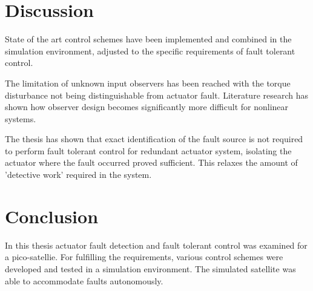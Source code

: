 
\section{Discussion}

State of the art control schemes have been implemented and combined in the simulation environment, adjusted to the specific requirements of fault tolerant control.

The limitation of unknown input observers has been reached with the torque disturbance not being distinguishable from actuator fault. Literature research has shown how observer design becomes significantly more difficult for nonlinear systems.

The thesis has shown that exact identification of the fault source is not required to perform fault tolerant control for redundant actuator system, isolating the actuator where the fault occurred proved sufficient. This relaxes the amount of 'detective work' required in the system.

\section{Conclusion}
In this thesis actuator fault detection and fault tolerant control was examined for a pico-satellie. For fulfilling the requirements, various control schemes were developed and tested in a simulation environment. The simulated satellite was able to accommodate faults autonomously.


